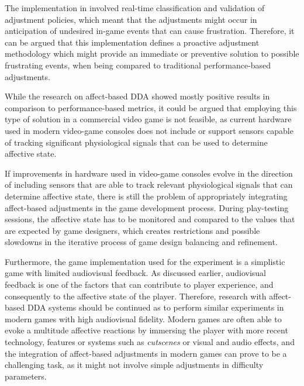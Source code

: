  The implementation in \cite{article_affectivedda} involved real-time classification and validation of adjustment policies, which meant that the adjustments might occur in anticipation of undesired in-game events that can cause frustration. Therefore, it can be argued that this implementation defines a proactive adjustment methodology which might provide an immediate or preventive solution to possible frustrating events, when being compared to traditional performance-based adjustments.


While the research on affect-based DDA showed mostly positive results in comparison to performance-based metrics, it could be argued that employing this type of solution in a commercial video game is not feasible, as current hardware used in modern video-game consoles does not include or support sensors capable of tracking significant physiological signals that can be used to determine affective state.

If improvements in hardware used in video-game consoles evolve in the direction of including sensors that are able to track relevant physiological signals that can determine affective state, there is still the problem of appropriately integrating affect-based adjustments in the game development process. During play-testing sessions, the affective state has to be monitored and compared to the values that are expected by game designers, which creates restrictions and possible slowdowns in the iterative process of game design balancing and refinement.

Furthermore, the game implementation used for the experiment is a simplistic game with limited audiovisual feedback. As discussed earlier, audiovisual feedback is one of the factors that can contribute to player experience, and consequently to the affective state of the player. Therefore, research with affect-based DDA systems should be continued as to perform similar experiments in modern games with high audiovisual fidelity. Modern games are often able to evoke a multitude affective reactions by immersing the player with more recent technology, features or systems such as \emph{cutscenes}  or visual and audio effects, and the integration of affect-based adjustments in modern games can prove to be a challenging task, as it might not involve simple adjustments in difficulty parameters.

